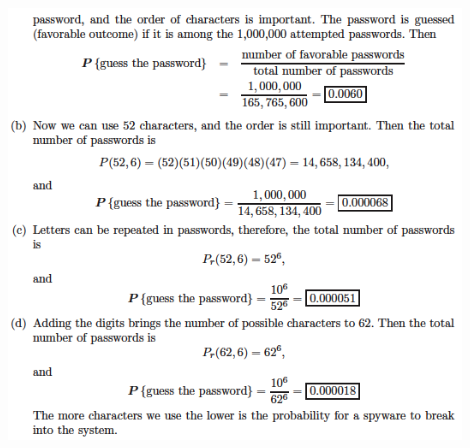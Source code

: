 \begin{enumerate}
{\begin{center}
\includegraphics[width=0.9\textwidth]{baron2-14b}
\end{center}
}
\end{enumerate}

